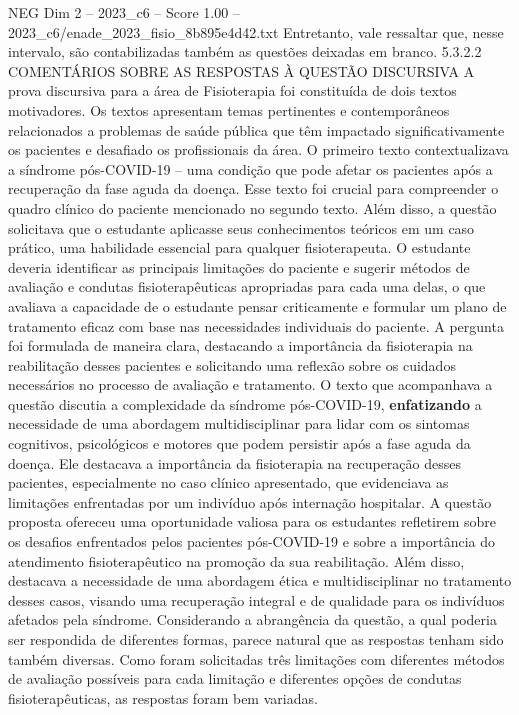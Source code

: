 \begin{textsample}{NEG Dim 2 – 2023\_c6 – Score 1.00 – 2023\_c6/enade\_2023\_fisio\_8b895e4d42.txt}
Entretanto, vale ressaltar que, nesse intervalo, são contabilizadas também as questões deixadas em branco. 5.3.2.2 COMENTÁRIOS SOBRE AS RESPOSTAS À QUESTÃO DISCURSIVA A prova discursiva para a área de Fisioterapia foi constituída de dois textos motivadores.
Os textos apresentam temas pertinentes e contemporâneos relacionados a problemas de saúde pública que têm impactado significativamente os pacientes e desafiado os profissionais da área.
O primeiro texto contextualizava a síndrome pós-COVID-19 – uma condição que pode afetar os pacientes após a recuperação da fase aguda da doença.
Esse texto foi crucial para compreender o quadro clínico do paciente mencionado no segundo texto.
Além disso, a questão solicitava que o estudante aplicasse seus conhecimentos teóricos em um caso prático, uma habilidade essencial para qualquer fisioterapeuta.
O estudante deveria identificar as principais limitações do paciente e sugerir métodos de avaliação e condutas fisioterapêuticas apropriadas para cada uma delas, o que avaliava a capacidade de o estudante pensar criticamente e formular um plano de tratamento eficaz com base nas necessidades individuais do paciente.
A pergunta foi formulada de maneira clara, destacando a importância da fisioterapia na reabilitação desses pacientes e solicitando uma reflexão sobre os cuidados necessários no processo de avaliação e tratamento.
O texto que acompanhava a questão discutia a complexidade da síndrome pós-COVID-19, \textbf{enfatizando} a necessidade de uma abordagem multidisciplinar para lidar com os sintomas cognitivos, psicológicos e motores que podem persistir após a fase aguda da doença.
Ele destacava a importância da fisioterapia na recuperação desses pacientes, especialmente no caso clínico apresentado, que evidenciava as limitações enfrentadas por um indivíduo após internação hospitalar.
A questão proposta ofereceu uma oportunidade valiosa para os estudantes refletirem sobre os desafios enfrentados pelos pacientes pós-COVID-19 e sobre a importância do atendimento fisioterapêutico na promoção da sua reabilitação.
Além disso, destacava a necessidade de uma abordagem ética e multidisciplinar no tratamento desses casos, visando uma recuperação integral e de qualidade para os indivíduos afetados pela síndrome.
Considerando a abrangência da questão, a qual poderia ser respondida de diferentes formas, parece natural que as respostas tenham sido também diversas.
Como foram solicitadas três limitações com diferentes métodos de avaliação possíveis para cada limitação e diferentes opções de condutas fisioterapêuticas, as respostas foram bem variadas.

\end{textsample}
